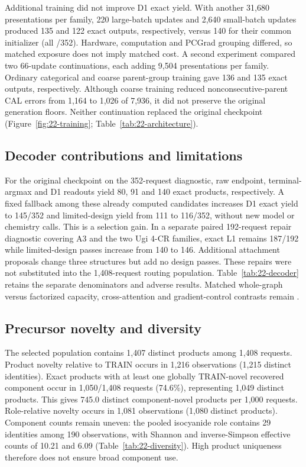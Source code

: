 Additional training did not improve D1 exact yield. With another 31,680 presentations per family,
220 large-batch updates and 2,640 small-batch updates produced 135 and 122 exact outputs,
respectively, versus 140 for their common initializer (all /352). Hardware, computation and
PCGrad grouping differed, so matched exposure does not imply matched cost. A second experiment
compared two 66-update continuations, each adding 9,504 presentations per family. Ordinary
categorical and coarse parent-group training gave 136 and 135 exact outputs, respectively.
Although coarse training reduced nonconsecutive-parent CAL errors from 1,164 to 1,026 of 7,936,
it did not preserve the original generation floors. Neither continuation replaced the original
checkpoint (Figure~\ref{fig:22-training}; Table~\ref{tab:22-architecture}).

\subsection{Decoder contributions and limitations}
For the original checkpoint on the 352-request diagnostic, raw endpoint, terminal-argmax and D1
readouts yield 80, 91 and 140 exact products, respectively. A fixed fallback among these already
computed candidates increases D1 exact yield to 145/352 and limited-design yield from 111 to
116/352, without new model or chemistry calls. This is a selection gain. In a separate paired
192-request repair diagnostic covering A3 and the two Ugi 4-CR families, exact L1 remains 187/192
while limited-design passes increase from 140 to 146. Additional attachment proposals change three
structures but add no design passes. These repairs were not substituted into the 1,408-request
routing population. Table~\ref{tab:22-decoder} retains the separate denominators and adverse results.
Matched whole-graph versus factorized capacity, cross-attention and gradient-control contrasts
remain .

\subsection{Precursor novelty and diversity}
The selected population contains 1,407 distinct products among 1,408 requests. Product novelty
relative to TRAIN occurs in 1,216 observations (1,215 distinct identities). Exact products with at
least one globally TRAIN-novel recovered component occur in 1,050/1,408 requests (74.6\%),
representing 1,049 distinct products. This gives 745.0 distinct component-novel products per 1,000
requests. Role-relative novelty occurs in 1,081 observations (1,080 distinct products).
Component counts remain uneven: the pooled isocyanide role contains 29 identities among 190
observations, with Shannon and inverse-Simpson effective counts of 10.21 and 6.09
(Table~\ref{tab:22-diversity}). High product uniqueness therefore does not ensure broad component use.

